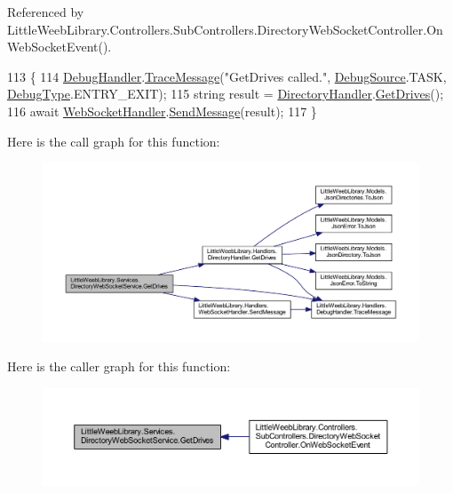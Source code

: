 Referenced by Little\+Weeb\+Library.\+Controllers.\+Sub\+Controllers.\+Directory\+Web\+Socket\+Controller.\+On\+Web\+Socket\+Event().


\begin{DoxyCode}
113         \{
114             \mbox{\hyperlink{class_little_weeb_library_1_1_handlers_1_1_debug_handler}{DebugHandler}}.\mbox{\hyperlink{class_little_weeb_library_1_1_handlers_1_1_debug_handler_afccb37dfd6b2114af72000c2f4fe4607}{TraceMessage}}(\textcolor{stringliteral}{"GetDrives called."}, 
      \mbox{\hyperlink{namespace_little_weeb_library_1_1_handlers_a2a6ca0775121c9c503d58aa254d292be}{DebugSource}}.TASK, \mbox{\hyperlink{namespace_little_weeb_library_1_1_handlers_ab66019ed40462876ec4e61bb3ccb0a62}{DebugType}}.ENTRY\_EXIT);
115             \textcolor{keywordtype}{string} result = \mbox{\hyperlink{class_little_weeb_library_1_1_handlers_1_1_directory_handler}{DirectoryHandler}}.\mbox{\hyperlink{class_little_weeb_library_1_1_handlers_1_1_directory_handler_a6ab9fa9b838eeca3f918429af0a3564d}{GetDrives}}();
116             await \mbox{\hyperlink{class_little_weeb_library_1_1_handlers_1_1_web_socket_handler}{WebSocketHandler}}.\mbox{\hyperlink{class_little_weeb_library_1_1_handlers_1_1_web_socket_handler_a1de289d54d665a32c93478c68d3e6ad0}{SendMessage}}(result);
117         \}
\end{DoxyCode}
Here is the call graph for this function\+:\nopagebreak
\begin{figure}[H]
\begin{center}
\leavevmode
\includegraphics[width=350pt]{class_little_weeb_library_1_1_services_1_1_directory_web_socket_service_a368f502e063381bccfed714d8350dc69_cgraph}
\end{center}
\end{figure}
Here is the caller graph for this function\+:\nopagebreak
\begin{figure}[H]
\begin{center}
\leavevmode
\includegraphics[width=350pt]{class_little_weeb_library_1_1_services_1_1_directory_web_socket_service_a368f502e063381bccfed714d8350dc69_icgraph}
\end{center}
\end{figure}
